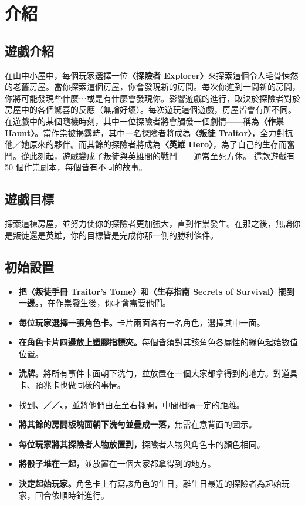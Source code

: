 
\section{介紹}

\subsection{遊戲介紹}
在山中小屋中，每個玩家選擇一位\textbf{〈探險者 Explorer〉}來探索這個令人毛骨悚然的老舊房屋。當你探索這個房屋，你會發現新的房間。每次你進到一間新的房間，你將可能發現些什麼⋯或是有什麼會發現你。影響遊戲的進行，取決於探險者對於房屋中的各個驚喜的反應（無論好壞）。每次遊玩這個遊戲，房屋皆會有所不同。\smallbreak
在遊戲中的某個隨機時刻，其中一位探險者將會觸發一個劇情——稱為\textbf{〈作祟 Haunt〉}。當作祟被揭露時，其中一名探險者將成為\textbf{〈叛徒 Traitor〉}，全力對抗他／她原來的夥伴。而其餘的探險者將成為\textbf{〈英雄 Hero〉}，為了自己的生存而奮鬥。從此刻起，遊戲變成了叛徒與英雄間的戰鬥——通常至死方休。\smallbreak
這款遊戲有 50 個作祟劇本，每個皆有不同的故事。

\subsection{遊戲目標}
探索這棟房屋，並努力使你的探險者更加強大，直到作祟發生。在那之後，無論你是叛徒還是英雄，你的目標皆是完成你那一側的勝利條件。

\subsection{初始設置}
\begin{itemize}
  \item \textbf{把〈叛徒手冊 Traitor’s Tome〉和〈生存指南 Secrets of Survival〉擺到一邊。}，在作祟發生後，你才會需要他們。
  \item \textbf{每位玩家選擇一張角色卡。}卡片兩面各有一名角色，選擇其中一面。
  \item \textbf{在角色卡片四邊放上塑膠指標夾。}每個皆須對其該角色各屬性的綠色起始數值位置。
  \item \textbf{洗牌。}將所有事件卡面朝下洗勻，並放置在一個大家都拿得到的地方。對道具卡、預兆卡也做同樣的事情。
  \item 找到\textbf{、／／、，}並將他們由左至右擺開，中間相隔一定的距離。
  \item \textbf{將其餘的房間板塊面朝下洗勻並疊成一落，}無需在意背面的圖示。
  \item \textbf{每位玩家將其探險者人物放置到，}探險者人物與角色卡的顏色相同。
  \item \textbf{將骰子堆在一起，}並放置在一個大家都拿得到的地方。
  \item \textbf{決定起始玩家。}角色卡上有寫該角色的生日，離生日最近的探險者為起始玩家，回合依順時針進行。
\end{itemize}
